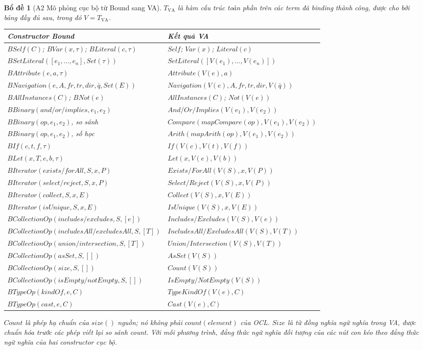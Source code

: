 \documentclass[11pt,a4paper]{article}
\newtheorem{lemma}{Bổ đề}
\theoremstyle{definition}
\begin{document}
\begin{lemma}[A2 Mô phỏng cục bộ từ Bound sang VA]
$T_{\mathrm{VA}}$ là hàm cấu trúc toàn phần trên các term đã binding thành
công, được cho bởi bảng đầy đủ sau, trong đó $V=T_{\mathrm{VA}}$.

\begingroup\small
\begin{longtable}{p{}p{}}
\toprule Constructor Bound & Kết quả VA\\ \midrule
$BSelf(C)$; $BVar(x,\tau)$; $BLiteral(c,\tau)$ & $Self$; $Var(x)$; $Literal(c)$\\
$BSetLiteral([e_1,\ldots,e_n],Set(\tau))$ & $SetLiteral([V(e_1),\ldots,V(e_n)])$\\
$BAttribute(e,a,\tau)$ & $Attribute(V(e),a)$\\
$BNavigation(e,A,fr,tr,dir,\bar q,Set(E))$ & $Navigation(V(e),A,fr,tr,dir,V(\bar q))$\\
$BAllInstances(C)$; $BNot(e)$ & $AllInstances(C)$; $Not(V(e))$\\
$BBinary(and/or/implies,e_1,e_2)$ & $And/Or/Implies(V(e_1),V(e_2))$\\
$BBinary(op,e_1,e_2)$, so sánh & $Compare(mapCompare(op),V(e_1),V(e_2))$\\
$BBinary(op,e_1,e_2)$, số học & $Arith(mapArith(op),V(e_1),V(e_2))$\\
$BIf(c,t,f,\tau)$ & $If(V(c),V(t),V(f))$\\
$BLet(x,T,e,b,\tau)$ & $Let(x,V(e),V(b))$\\
$BIterator(exists/forAll,S,x,P)$ & $Exists/ForAll(V(S),x,V(P))$\\
$BIterator(select/reject,S,x,P)$ & $Select/Reject(V(S),x,V(P))$\\
$BIterator(collect,S,x,E)$ & $Collect(V(S),x,V(E))$\\
$BIterator(isUnique,S,x,E)$ & $IsUnique(V(S),x,V(E))$\\
$BCollectionOp(includes/excludes,S,[e])$ & $Includes/Excludes(V(S),V(e))$\\
$BCollectionOp(includesAll/excludesAll,S,[T])$ & $IncludesAll/ExcludesAll(V(S),V(T))$\\
$BCollectionOp(union/intersection,S,[T])$ & $Union/Intersection(V(S),V(T))$\\
$BCollectionOp(asSet,S,[])$ & $AsSet(V(S))$\\
$BCollectionOp(size,S,[])$ & $Count(V(S))$\\
$BCollectionOp(isEmpty/notEmpty,S,[])$ & $IsEmpty/NotEmpty(V(S))$\\
$BTypeOp(kindOf,e,C)$ & $TypeKindOf(V(e),C)$\\
$BTypeOp(cast,e,C)$ & $Cast(V(e),C)$\\
\bottomrule
\end{longtable}
\endgroup

$Count$ là phép hạ chuẩn của $size()$ nguồn; nó không phải
$count(element)$ của OCL. $Size$ là từ đồng nghĩa ngữ nghĩa trong VA, được
chuẩn hóa trước các phép viết lại so sánh count. Với mỗi phương trình, đẳng thức
ngữ nghĩa đối tượng của các nút con kéo theo đẳng thức ngữ nghĩa của hai
constructor cục bộ.
\end{lemma}
\end{document}
